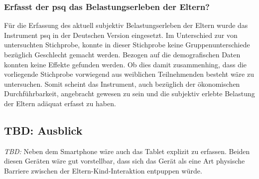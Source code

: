 \subsubsection{Erfasst der \acrshort{psq} das Belastungserleben der Eltern?}
Für die Erfassung des aktuell subjektiv Belastungserleben der Eltern wurde das Instrument \acrfull{psq} in der Deutschen Version eingesetzt. Im Unterschied zur von  untersuchten Stichprobe, konnte in dieser Stichprobe keine Gruppenunterschiede bezüglich Geschlecht gemacht werden. Bezogen auf die demografischen Daten konnten keine Effekte gefunden werden. Ob dies damit zusammenhing, dass die vorliegende Stichprobe vorwiegend aus weiblichen Teilnehmenden besteht wäre zu untersuchen. Somit scheint das Instrument, auch bezüglich der ökonomischen Durchführbarkeit, angebracht gewesen zu sein und die subjektiv erlebte Belastung der Eltern adäquat erfasst zu haben.
   

\subsection{TBD: Ausblick} \label{sec:Ausblick}
\textit{TBD:} Neben dem Smartphone wäre auch das Tablet explizit zu erfassen. Beiden diesen Geräten wäre gut vorstellbar, dass sich das Gerät als eine Art physische Barriere zwischen der Eltern-Kind-Interaktion entpuppen würde.